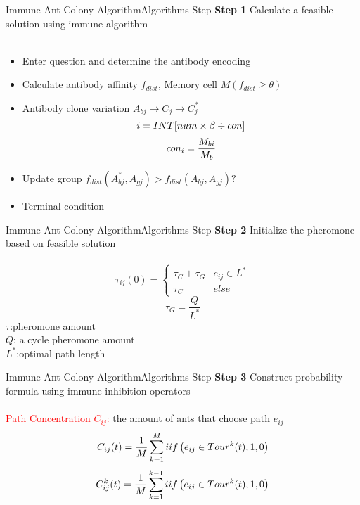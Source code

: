 \documentclass{beamer}
\begin{document}
\begin{frame}{Immune Ant Colony Algorithm}{Algorithms Step}
\large \textbf{Step 1} \normalsize{Calculate a feasible solution using immune algorithm}\\~\\
\begin{itemize}
\item{Enter question and determine the antibody encoding}
\item{Calculate antibody affinity $f_{dist}$, Memory cell $M(f_{dist}\geqslant\theta)$}
\item{Antibody clone variation \qquad $A_{bj}\rightarrow C_j \rightarrow C_j^*$}
\begin{equation}\small{
i=INT[num \times \beta \div con]}
\end{equation}
\begin{equation}\small{
con_i=\frac{M_{bi}}{M_{b}} }
\end{equation}
\item{Update group \qquad \small{$f_{dist}(A_{bj}^*,A_{gj}) > f_{dist}(A_{bj},A_{gj}) ?$}} 
\item{Terminal condition}
\end{itemize}
\end{frame}

\begin{frame}{Immune Ant Colony Algorithm}{Algorithms Step}
\large \textbf{Step 2} \normalsize {Initialize the pheromone based on feasible solution}\\~\\
\begin{equation}
\tau_{ij}(0)=
\begin{cases}
\tau_C +\tau_G & e_{ij} \in L^* \\
\tau_C & else
\end{cases}
\end{equation}
\begin{equation}
\tau_G = \frac{Q}{L^*}
\end{equation}
\centering \small{
{$\tau$:pheromone amount}\\ {$Q$: a cycle pheromone amount}\\ {$L^*$:optimal path length}
}
\end{frame}

\begin{frame}{Immune Ant Colony Algorithm}{Algorithms Step}
\large \textbf{Step 3} \normalsize {Construct probability formula using immune inhibition operators}\\~\\
\centering \small { \textcolor{red}{Path Concentration $C_{ij}$:} the amount of ants that choose path $e_{ij}$}
\begin{equation}\small{
C_{ij}(t) = \frac{1}{M} \sum\limits_{k=1}^{M}iif \left(e_{ij} \in Tour^k(t),1,0\right)}
\end{equation}
\begin{equation}\small{
C_{ij}^k(t) = \frac{1}{M} \sum\limits_{k=1}^{k-1}iif \left(e_{ij} \in Tour^k(t),1,0\right)}
\end{equation}
\end{frame}
\end{document}
